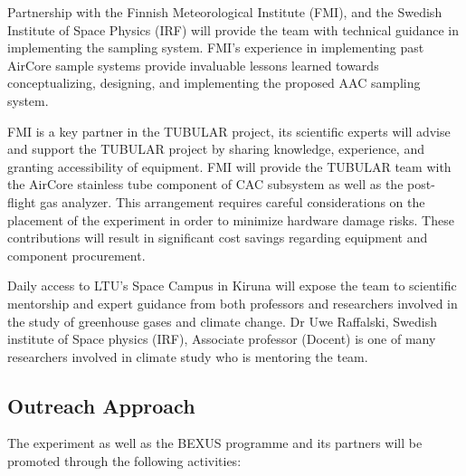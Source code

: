 \documentclass[a4paper,12pt,twoside]{article}
\begin{document}
Partnership with the Finnish Meteorological Institute (FMI), and the Swedish Institute of Space Physics (IRF) will provide the team with technical guidance in implementing the sampling system. FMI’s experience in implementing past AirCore sample systems provide invaluable lessons learned towards conceptualizing, designing, and implementing the proposed AAC sampling system.

FMI is a key partner in the TUBULAR project, its scientific experts will advise and support the TUBULAR project by sharing knowledge, experience, and granting accessibility of equipment. FMI will provide the TUBULAR team with the AirCore stainless tube component of CAC subsystem as well as the post-flight gas analyzer. This arrangement requires careful considerations on the placement of the experiment in order to minimize hardware damage risks. These contributions will result in significant cost savings regarding equipment and component procurement.

Daily access to LTU's Space Campus in Kiruna will expose the team to scientific mentorship and expert guidance from both professors and researchers involved in the study of greenhouse gases and climate change. Dr Uwe Raffalski, Swedish institute of Space physics (IRF), Associate professor (Docent) is one of many researchers involved in climate study who is mentoring the team.
\pagebreak

\subsection{Outreach Approach}

The experiment as well as the BEXUS programme and its partners will be promoted through the following activities:
\end{document}
